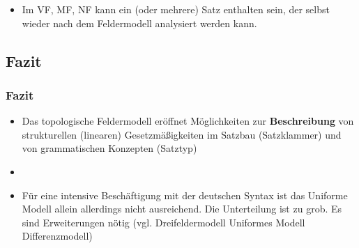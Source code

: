 \begin{frame}

\begin{itemize}
	\item Im VF, MF, NF kann ein (oder mehrere) Satz enthalten sein, der selbst wieder nach dem Feldermodell analysiert werden kann. 


\begin{table}
\centering
{}
\end{table}

\end{itemize}

\end{frame}


\subsection{Fazit}


\begin{frame}
\frametitle{Fazit}

\begin{itemize}
	\item Das topologische Feldermodell eröffnet Möglichkeiten zur \textbf{Beschreibung} von strukturellen (linearen) Gesetzmäßigkeiten im Satzbau (\zB Satzklammer) und von grammatischen Konzepten (\zB Satztyp)
	\item[]
	\item Für eine intensive Beschäftigung mit der deutschen Syntax ist das Uniforme Modell allein allerdings nicht ausreichend. Die Unterteilung ist zu grob. Es sind Erweiterungen nötig (vgl. Dreifeldermodell \ras Uniformes Modell \ras Differenzmodell)

\end{itemize}

\end{frame}

